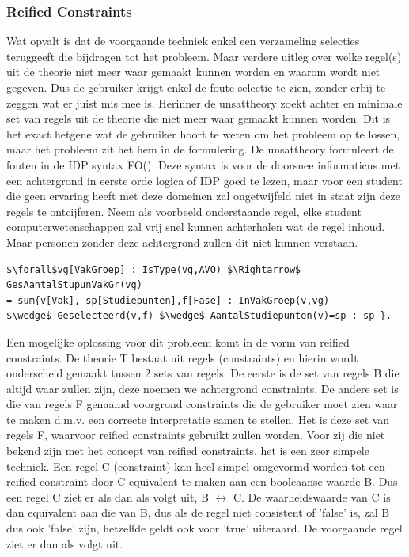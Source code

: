\subsubsection{Reified Constraints}
Wat opvalt is dat de voorgaande techniek enkel een verzameling selecties teruggeeft die bijdragen tot het probleem. Maar verdere uitleg over welke regel(s) uit de theorie niet meer waar gemaakt kunnen worden en waarom wordt niet gegeven. Dus de gebruiker krijgt enkel de foute selectie te zien, zonder erbij te zeggen wat er juist mis mee is. Herinner de unsattheory zoekt achter en minimale set van regels uit de theorie die niet meer waar gemaakt kunnen worden. Dit is het exact hetgene wat de gebruiker hoort te weten om het probleem op te lossen, maar het probleem zit het hem in de formulering. De unsattheory formuleert de fouten in de IDP syntax FO(\textperiodcentered). Deze syntax is voor de doorsnee informaticus met een achtergrond in eerste orde logica of IDP goed te lezen, maar voor een student die geen ervaring heeft met deze domeinen zal ongetwijfeld niet in staat zijn deze regels te ontcijferen. Neem als voorbeeld onderstaande regel, elke student computerwetenschappen zal vrij snel kunnen achterhalen wat de regel inhoud. Maar personen zonder deze achtergrond zullen dit niet kunnen verstaan.
\begin{lstlisting}[mathescape, caption=IDP Rule Example, frame=single]
$\forall$vg[VakGroep] : IsType(vg,AVO) $\Rightarrow$ GesAantalStupunVakGr(vg) 
= sum{v[Vak], sp[Studiepunten],f[Fase] : InVakGroep(v,vg) 
$\wedge$ Geselecteerd(v,f) $\wedge$ AantalStudiepunten(v)=sp : sp }.
\end{lstlisting}
Een mogelijke oplossing voor dit probleem komt in de vorm van reified constraints. De theorie T bestaat uit regels (constraints) en hierin wordt onderscheid gemaakt tussen 2 sets van regels. De eerste is de set van regels B die altijd waar zullen zijn, deze noemen we achtergrond constraints. De andere set is die van regels F genaamd voorgrond constraints die de gebruiker moet zien waar te maken d.m.v. een correcte interpretatie samen te stellen. Het is deze set van regels F, waarvoor reified constraints gebruikt zullen worden. Voor zij die niet bekend zijn met het concept van reified constraints, het is een zeer simpele techniek. Een regel C (constraint) kan heel simpel omgevormd worden tot een reified constraint door C equivalent te maken aan een booleaanse waarde B. Dus een regel C ziet er als dan als volgt uit, B $\leftrightarrow$ C. De waarheidswaarde van C is dan equivalent aan die van B, dus als de regel niet consistent of 'false' is, zal B dus ook 'false' zijn, hetzelfde geldt ook voor 'true' uiteraard. De voorgaande regel ziet er dan als volgt uit. 
